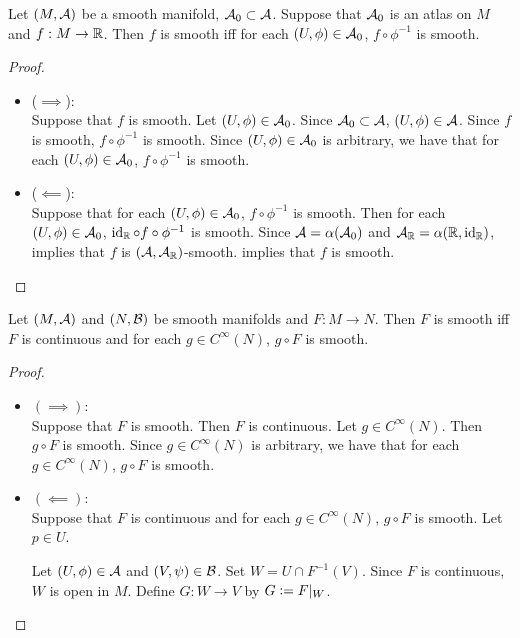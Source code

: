 \documentclass{book}
\begin{document}
\begin{ex}  
	Let $(M, \mathcal{A})$ be a smooth manifold, $\mathcal{A}_0 \subset \mathcal{A}$. Suppose that $\mathcal{A}_0$ is an atlas on $M$ and $f:M \rightarrow \mathbb{R}$. Then $f$ is smooth iff for each $(U, \phi) \in \mathcal{A}_0$, $f \circ \phi^{-1}$ is smooth.
\end{ex}

\begin{proof}\
	\begin{itemize}
		\item ($\implies$): \\
		Suppose that $f$ is smooth. Let $(U, \phi) \in \mathcal{A}_0$. Since $\mathcal{A}_0 \subset \mathcal{A}$, $(U, \phi) \in \mathcal{A}$. Since $f$ is smooth, $f \circ \phi^{-1}$ is smooth. Since $(U, \phi) \in \mathcal{A}_0$ is arbitrary, we have that for each $(U, \phi) \in \mathcal{A}_0$, $f \circ \phi^{-1}$ is smooth.
		\item ($\impliedby$): \\
		Suppose that for each $(U, \phi) \in \mathcal{A}_0$, $f \circ \phi^{-1}$ is smooth. Then for each $(U, \phi) \in \mathcal{A}_0$, $\operatorname{id}_{\mathbb{R}} \circ f \circ \phi^{-1}$ is smooth. Since $\mathcal{A} = \alpha(\mathcal{A}_0)$ and $\mathcal{A}_{\mathbb{R}} = \alpha(\mathbb{R}, \operatorname{id}_{\mathbb{R}})$,  implies that $f$ is $(\mathcal{A}, \mathcal{A}_{\mathbb{R}})$-smooth.  implies that $f$ is smooth.
	\end{itemize}
\end{proof}

\begin{ex}  
	Let $(M, \mathcal{A})$ and $(N, \mathcal{B})$ be smooth manifolds and $F:M \rightarrow N$. Then $F$ is smooth iff $F$ is continuous and for each $g \in C^{\infty}(N)$, $g \circ F$ is smooth.
\end{ex}

\begin{proof}\
	\begin{itemize}
		\item $(\implies)$: \\
		Suppose that $F$ is smooth. Then $F$ is continuous. Let $g \in C^{\infty}(N)$. Then $g \circ F$ is smooth. Since $g \in C^{\infty}(N)$ is arbitrary, we have that for each $g \in C^{\infty}(N)$, $g \circ F$ is smooth.
		\item $(\impliedby)$: \\
		Suppose that $F$ is continuous and for each $g \in C^{\infty}(N)$, $g \circ F$ is smooth. Let $p \in U$. 
		
		
		Let $(U, \phi) \in \mathcal{A}$ and $(V, \psi) \in \mathcal{B}$. Set $W = U \cap F^{-1}(V)$. Since $F$ is continuous, $W$ is open in $M$. Define $G:W \rightarrow V$ by $G \vcentcolon= F|_W$. 
	\end{itemize}
\end{proof}
\end{document}
